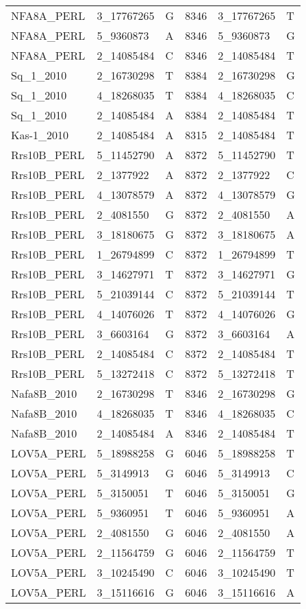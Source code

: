 \begin{center}
\begin{longtable}{|l|l|l|l|l|l|}
NFA8A\_PERL&3\_17767265&G&8346&3\_17767265&T\\
NFA8A\_PERL&5\_9360873&A&8346&5\_9360873&G\\
NFA8A\_PERL&2\_14085484&C&8346&2\_14085484&T\\
Sq\_1\_2010&2\_16730298&T&8384&2\_16730298&G\\
Sq\_1\_2010&4\_18268035&T&8384&4\_18268035&C\\
Sq\_1\_2010&2\_14085484&A&8384&2\_14085484&T\\
Kas-1\_2010&2\_14085484&A&8315&2\_14085484&T\\
Rrs10B\_PERL&5\_11452790&A&8372&5\_11452790&T\\
Rrs10B\_PERL&2\_1377922&A&8372&2\_1377922&C\\
Rrs10B\_PERL&4\_13078579&A&8372&4\_13078579&G\\
Rrs10B\_PERL&2\_4081550&G&8372&2\_4081550&A\\
Rrs10B\_PERL&3\_18180675&G&8372&3\_18180675&A\\
Rrs10B\_PERL&1\_26794899&C&8372&1\_26794899&T\\
Rrs10B\_PERL&3\_14627971&T&8372&3\_14627971&G\\
Rrs10B\_PERL&5\_21039144&C&8372&5\_21039144&T\\
Rrs10B\_PERL&4\_14076026&T&8372&4\_14076026&G\\
Rrs10B\_PERL&3\_6603164&G&8372&3\_6603164&A\\
Rrs10B\_PERL&2\_14085484&C&8372&2\_14085484&T\\
Rrs10B\_PERL&5\_13272418&C&8372&5\_13272418&T\\
Nafa8B\_2010&2\_16730298&T&8346&2\_16730298&G\\
Nafa8B\_2010&4\_18268035&T&8346&4\_18268035&C\\
Nafa8B\_2010&2\_14085484&A&8346&2\_14085484&T\\
LOV5A\_PERL&5\_18988258&G&6046&5\_18988258&T\\
LOV5A\_PERL&5\_3149913&G&6046&5\_3149913&C\\
LOV5A\_PERL&5\_3150051&T&6046&5\_3150051&G\\
LOV5A\_PERL&5\_9360951&T&6046&5\_9360951&A\\
LOV5A\_PERL&2\_4081550&G&6046&2\_4081550&A\\
LOV5A\_PERL&2\_11564759&G&6046&2\_11564759&T\\
LOV5A\_PERL&3\_10245490&C&6046&3\_10245490&T\\
LOV5A\_PERL&3\_15116616&G&6046&3\_15116616&A\\

\end{longtable}
\end{center}
